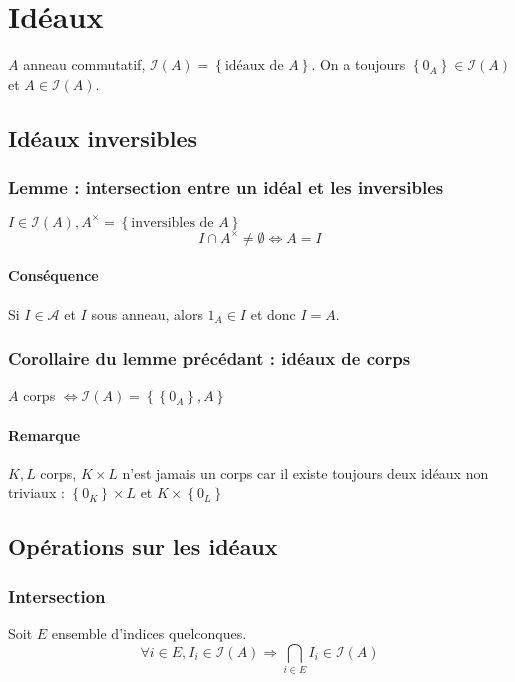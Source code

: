 \documentclass[reqno,a4paper,10pt]{report}
\newcommand{\set}[1]{\left\lbrace #1 \right\rbrace} %
\newcommand{\so}{\Rightarrow}
\begin{document}
\section{Idéaux}
$A$ anneau commutatif, $\mathcal{I}(A) = \set{\text{idéaux de }A}$. On a
toujours $\set{0_A} \in \mathcal{I}(A)$ et $A \in \mathcal{I}(A)$.
\subsection{Idéaux inversibles}
\subsubsection{Lemme : intersection entre un idéal et les inversibles}
$I \in \mathcal{I}(A), A^\times = \set{\text{inversibles de } A}$
\[I\cap A^\times \neq \emptyset \iff A=I\]

\begin{comment}
  Preuve 22/10/09 p1
\end{comment}

\paragraph{Conséquence} Si $I\in \mathcal{A}$ et $I$ sous anneau, alors $1_A
\in I$ et donc $I=A$.

\subsubsection{Corollaire du lemme précédant : idéaux de corps}
$A$ corps $\iff \mathcal{I}(A) = \set{\set{0_A}, A}$

\paragraph{Remarque} $K, L$ corps, $K\times L$ n'est jamais un corps car il
existe toujours deux idéaux non triviaux : $\set{0_K}\times L$ et
$K\times \set{0_L}$

\subsection{Opérations sur les idéaux}
\subsubsection{Intersection}
Soit $E$ ensemble d'indices quelconques.
\[\forall i \in E, I_i \in \mathcal{I}(A) \so \bigcap_{i\in E} I_i \in
\mathcal{I}(A)\]
\begin{comment}
  Preuve 22/10/09 p2
\end{comment}
\end{document}
